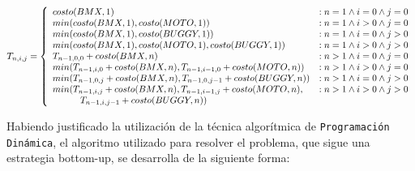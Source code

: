 \begin{displaymath}
   T_{n,i,j} = \left\{
     \begin{array}{lr}
       costo(BMX,1) & : n = 1 \land i = 0 \land j = 0 \\
       min(costo(BMX,1), costo(MOTO,1))  & : n = 1 \land i > 0 \land j = 0  \\
       min(costo(BMX,1), costo(BUGGY,1))  & : n = 1 \land i = 0 \land j > 0  \\
       min(costo(BMX,1), costo(MOTO,1), costo(BUGGY,1) )  & : n = 1 \land i > 0 \land j > 0  \\
       T_{n-1,0,0} + costo(BMX,n) & : n > 1 \land i = 0 \land j = 0  \\
       min(T_{n-1,i,0} + costo(BMX,n), T_{n-1,i-1,0} + costo(MOTO,n)) & : n > 1 \land i > 0 \land j = 0  \\
       min(T_{n-1,0,j} + costo(BMX,n), T_{n-1,0,j-1} + costo(BUGGY,n)) & : n > 1 \land i = 0 \land j > 0  \\
       min(T_{n-1,i,j} + costo(BMX,n), T_{n-1,i-1,j} + costo(MOTO,n), & : n > 1 \land i > 0 \land j > 0 \\
                    \indent \indent T_{n-1,i,j-1} + costo(BUGGY,n))
     \end{array}
   \right.
\end{displaymath}

Habiendo justificado la utilización de la técnica algorítmica de \texttt{Programación Dinámica}, el algoritmo utilizado para resolver el problema, que sigue una estrategia bottom-up, se desarrolla de la siguiente forma:


